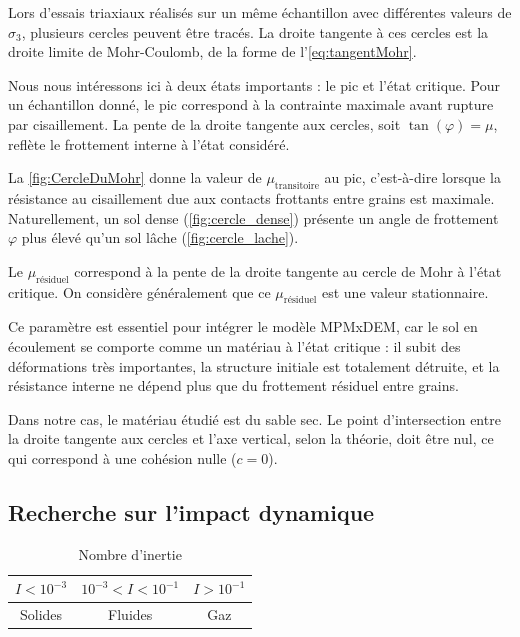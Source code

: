 \documentclass[a4paper,12pt]{report}
\begin{document}
Lors d’essais triaxiaux réalisés sur un même échantillon avec différentes valeurs de $\sigma_3$, plusieurs cercles peuvent être tracés. La droite tangente à ces cercles est la droite limite de Mohr-Coulomb, de la forme de l'\autoref{eq:tangentMohr}.  

Nous nous intéressons ici à deux états importants : le pic et l’état critique.  
Pour un échantillon donné, le pic correspond à la contrainte maximale avant rupture par cisaillement.  
La pente de la droite tangente aux cercles, soit $\tan(\varphi) = \mu$, reflète le frottement interne à l’état considéré.  

La \autoref{fig:CercleDuMohr} donne la valeur de $\mu_{\text{transitoire}}$ au pic, c’est-à-dire lorsque la résistance au cisaillement due aux contacts frottants entre grains est maximale.  
Naturellement, un sol dense (\autoref{fig:cercle_dense}) présente un angle de frottement $\varphi$ plus élevé qu’un sol lâche (\autoref{fig:cercle_lache}).  

Le $\mu_{\text{résiduel}}$ correspond à la pente de la droite tangente au cercle de Mohr à l’état critique.  
On considère généralement que ce $\mu_{\text{résiduel}}$ est une valeur stationnaire.  

Ce paramètre est essentiel pour intégrer le modèle MPMxDEM, car le sol en écoulement se comporte comme un matériau à l’état critique :  
il subit des déformations très importantes, la structure initiale est totalement détruite, et la résistance interne ne dépend plus que du frottement résiduel entre grains.  

Dans notre cas, le matériau étudié est du sable sec. Le point d’intersection entre la droite tangente aux cercles et l’axe vertical, selon la théorie, doit être nul, ce qui correspond à une cohésion nulle ($c=0$).

\subsection{Recherche sur l'impact dynamique} \label{sec:dynamique}
\begin{table}[h!]
\centering
\begin{tabular}{|c|c|c|}
\hline
$ I < 10^{-3} $ & $ 10^{-3} < I < 10^{-1} $ & $ I > 10^{-1} $ \\ 
\hline
Solides & Fluides & Gaz \\  
\hline
\end{tabular}
\caption{Nombre d’inertie}
\label{tab:nombreInertie}
\end{table}
\end{document}
